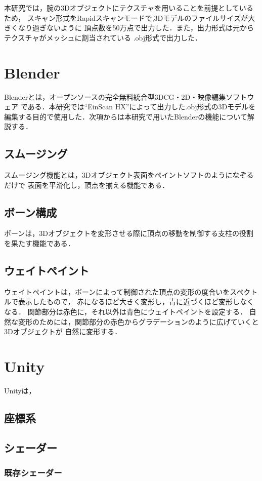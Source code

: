 \documentclass{ltjsreport}
\begin{document}
			本研究では，腕の3Dオブジェクトにテクスチャを用いることを前提としているため，
			スキャン形式をRapidスキャンモードで,3Dモデルのファイルサイズが大きくなり過ぎないように
			頂点数を50万点で出力した．また，出力形式は元からテクスチャがメッシュに割当されている
			.obj形式で出力した．

	\section{Blender}
	
		Blenderとは，オープンソースの完全無料統合型3DCG・2D・映像編集ソフトウェア
		である．本研究では``EinScan HX''によって出力した.obj形式の3Dモデルを
		編集する目的で使用した．次項からは本研究で用いたBlenderの機能について解説する．
		\subsection{スムージング}
			スムージング機能とは，3Dオブジェクト表面をペイントソフトのようになぞるだけで
			表面を平滑化し，頂点を揃える機能である．
		\subsection{ボーン構成}
			ボーンは，3Dオブジェクトを変形させる際に頂点の移動を制御する支柱の役割を果たす機能である．
		\subsection{ウェイトペイント}
			ウェイトペイントは，ボーンによって制御された頂点の変形の度合いをスペクトルで表示したもので，
			赤になるほど大きく変形し，青に近づくほど変形しなくなる．
			関節部分は赤色に，それ以外は青色にウェイトペイントを設定する．
			自然な変形のためには，関節部分の赤色からグラデーションのように広げていくと3Dオブジェクトが
			自然に変形する．
	\section{Unity}
		Unityは，
		\subsection{座標系}
		\subsection{シェーダー}
			\subsubsection{既存シェーダー}
\end{document}
